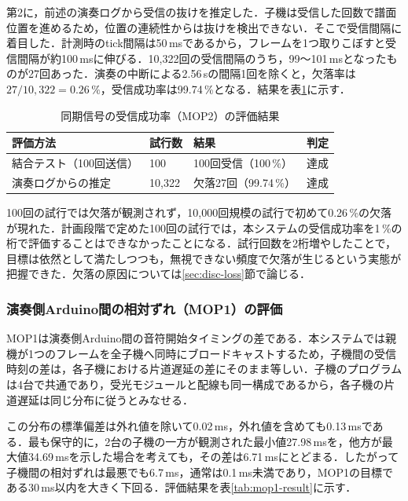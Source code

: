 \documentclass[uplatex,dvipdfmx]{jlreq}
\begin{document}
第2に，前述の演奏ログから受信の抜けを推定した．子機は受信した回数で譜面位置を進めるため，位置の連続性からは抜けを検出できない．そこで受信間隔に着目した．計測時のtick間隔は50\,msであるから，フレームを1つ取りこぼすと受信間隔が約100\,msに伸びる．10{,}322回の受信間隔のうち，99〜101\,msとなったものが27回あった．演奏の中断による2.56\,sの間隔1回を除くと，欠落率は$27/10{,}322 = 0.26\,\%$，受信成功率は99.74\,\%となる．結果を表\ref{tab:recv-result}に示す．

\begin{table}[tb]
\caption{同期信号の受信成功率（MOP2）の評価結果}
\label{tab:recv-result}
\begin{center}
\small
\begin{tabular}{lllc}
\hline
評価方法 & 試行数 & 結果 & 判定 \\
\hline
結合テスト（100回送信） & 100 & 100回受信（100\,\%） & 達成 \\
演奏ログからの推定 & 10{,}322 & 欠落27回（99.74\,\%） & 達成 \\
\hline
\end{tabular}
\end{center}
\end{table}

100回の試行では欠落が観測されず，10{,}000回規模の試行で初めて0.26\,\%の欠落が現れた．計画段階で定めた100回の試行では，本システムの受信成功率を1\,\%の桁で評価することはできなかったことになる．試行回数を2桁増やしたことで，目標は依然として満たしつつも，無視できない頻度で欠落が生じるという実態が把握できた．欠落の原因については\ref{sec:disc-loss}節で論じる．

\subsubsection{演奏側Arduino間の相対ずれ（MOP1）の評価}

MOP1は演奏側Arduino間の音符開始タイミングの差である．本システムでは親機が1つのフレームを全子機へ同時にブロードキャストするため，子機間の受信時刻の差は，各子機における片道遅延の差にそのまま等しい．子機のプログラムは4台で共通であり，受光モジュールと配線も同一構成であるから，各子機の片道遅延は同じ分布に従うとみなせる．

この分布の標準偏差は外れ値を除いて0.02\,ms，外れ値を含めても0.13\,msである．最も保守的に，2台の子機の一方が観測された最小値27.98\,msを，他方が最大値34.69\,msを示した場合を考えても，その差は6.71\,msにとどまる．したがって子機間の相対ずれは最悪でも6.7\,ms，通常は0.1\,ms未満であり，MOP1の目標である30\,ms以内を大きく下回る．評価結果を表\ref{tab:mop1-result}に示す．
\end{document}
